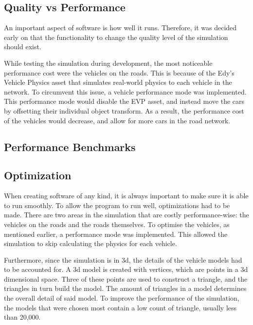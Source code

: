     \subsection{Quality vs Performance}
        An important aspect of software is how well it runs. Therefore, it was decided early on that the functionality to change the quality level of the simulation should exist. 
    
        While testing the simulation during development, the most noticeable performance cost were the vehicles on the roads. This is because of the Edy's Vehicle Physics asset that simulates real-world physics to each vehicle in the network. To circumvent this issue, a vehicle performance mode was implemented. This performance mode would disable the EVP asset, and instead move the cars by offsetting their individual object transform. As a result, the performance cost of the vehicles would decrease, and allow for more cars in the road network.


    \subsection{Performance Benchmarks}
    
    \subsection{Optimization} 
        When creating software of any kind, it is always important to make sure it is able to run smoothly. To allow the program to run well, optimizations had to be made. There are two areas in the simulation that are costly performance-wise: the vehicles on the roads and the roads themselves. To optimise the vehicles, as mentioned earlier, a performance mode was implemented. This allowed the simulation to skip calculating the physics for each vehicle. 
    
        Furthermore, since the simulation is in 3d, the details of the vehicle models had to be accounted for. A 3d model is created with vertices, which are points in a 3d dimensional space. Three of these points are used to construct a triangle, and the triangles in turn build the model. The amount of triangles in a model determines the overall detail of said model. To improve the performance of the simulation, the models that were chosen most contain a low count of triangle, usually less than 20,000. 


